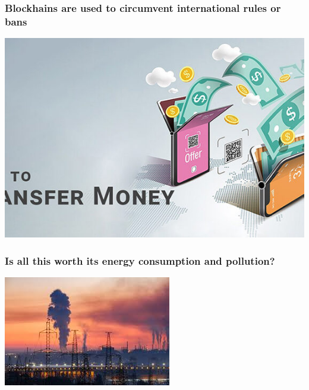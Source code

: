 \documentclass[11pt]{beamer}  %
\begin{document}
\begin{frame}\frametitle{Blockhains are used to circumvent international rules or bans}

  \begin{center}
    \includegraphics[scale=0.5, clip=false]{pictures/send-money.jpg}
  \end{center}

\end{frame}

\begin{frame}\frametitle{Is all this worth its energy consumption and pollution?}

  \begin{center}
    \includegraphics[scale=1, clip=false]{pictures/pollution.jpg}
  \end{center}

\end{frame}
\end{document}
